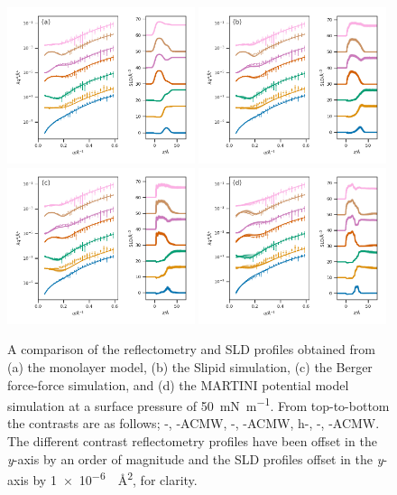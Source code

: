 \documentclass[amsmath,amssymb,superscriptaddress]{revtex4-1}
\begin{document}
\begin{figure}
 \centering
 \includegraphics[width=0.49\textwidth]{trad_50}
 \includegraphics[width=0.49\textwidth]{sim_slipids_50} \\
 \includegraphics[width=0.49\textwidth]{sim_berger_50}
 \includegraphics[width=0.49\textwidth]{sim_martini_50}
 \caption{A comparison of the reflectometry and SLD profiles obtained from (a) the monolayer model, (b) the Slipid simulation, (c) the Berger force-force simulation, and (d) the MARTINI potential model simulation at a surface pressure of \SI{50}{\milli\newton\per\meter}. From top-to-bottom the contrasts are as follows; -, -ACMW, -, -ACMW, h-, -, -ACMW. The different contrast reflectometry profiles have been offset in the \emph{y}-axis by an order of magnitude and the SLD profiles offset in the \emph{y}-axis by \SI{1e-6}{\per\square\angstrom}, for clarity.}
 \label{fig:sp50}
\end{figure}
%
\end{document}
